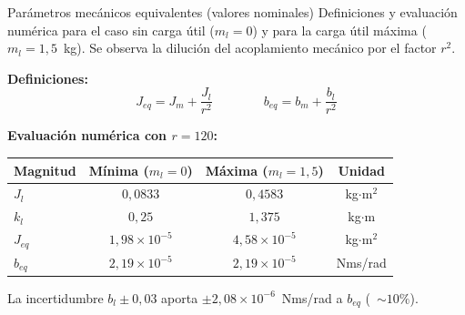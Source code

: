 \documentclass[aspectratio=169,t]{beamer}
\begin{document}
\begin{frame}{Parámetros mecánicos equivalentes (valores nominales)}
{\small\color{uncGray}Definiciones y evaluación numérica para el caso sin carga útil ($m_l=0$) y para la carga útil máxima ($m_l=1{,}5$~kg). Se observa la dilución del acoplamiento mecánico por el factor $r^2$.}\par
\vspace{3mm}

\textbf{Definiciones:}
\begin{equation*}
J_{eq} = J_m + \frac{J_l}{r^2}
\qquad\qquad
b_{eq} = b_m + \frac{b_l}{r^2}
\end{equation*}

\vspace{4mm}
\textbf{Evaluación numérica con $r=120$:}\par
\vspace{2mm}
\centering
\renewcommand{\arraystretch}{1.25}
\begin{tabular}{|l|c|c|c|}
\hline
\textbf{Magnitud} & \textbf{Mínima ($m_l=0$)} & \textbf{Máxima ($m_l=1{,}5$)} & \textbf{Unidad} \\
\hline
$J_l$    & $0{,}0833$              & $0{,}4583$              & kg$\cdot$m$^2$ \\
$k_l$    & $0{,}25$                & $1{,}375$               & kg$\cdot$m \\
$J_{eq}$ & $1{,}98\times 10^{-5}$  & $4{,}58\times 10^{-5}$  & kg$\cdot$m$^2$ \\
$b_{eq}$ & $2{,}19\times 10^{-5}$  & $2{,}19\times 10^{-5}$  & Nms/rad \\
\hline
\end{tabular}

\vspace{3mm}
{\small La incertidumbre $b_l\pm 0{,}03$ aporta $\pm 2{,}08{\times}10^{-6}$~Nms/rad a $b_{eq}$ (~$\sim 10\%$).}
\end{frame}
\end{document}

